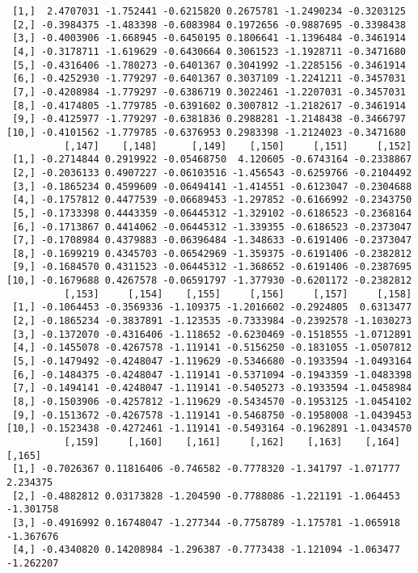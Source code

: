 \documentclass[
  letterpaper,
  DIV=11,
  numbers=noendperiod]{scrreprt}
\begin{document}
\begin{verbatim}
 [1,]  2.4707031 -1.752441 -0.6215820 0.2675781 -1.2490234 -0.3203125
 [2,] -0.3984375 -1.483398 -0.6083984 0.1972656 -0.9887695 -0.3398438
 [3,] -0.4003906 -1.668945 -0.6450195 0.1806641 -1.1396484 -0.3461914
 [4,] -0.3178711 -1.619629 -0.6430664 0.3061523 -1.1928711 -0.3471680
 [5,] -0.4316406 -1.780273 -0.6401367 0.3041992 -1.2285156 -0.3461914
 [6,] -0.4252930 -1.779297 -0.6401367 0.3037109 -1.2241211 -0.3457031
 [7,] -0.4208984 -1.779297 -0.6386719 0.3022461 -1.2207031 -0.3457031
 [8,] -0.4174805 -1.779785 -0.6391602 0.3007812 -1.2182617 -0.3461914
 [9,] -0.4125977 -1.779297 -0.6381836 0.2988281 -1.2148438 -0.3466797
[10,] -0.4101562 -1.779785 -0.6376953 0.2983398 -1.2124023 -0.3471680
          [,147]    [,148]      [,149]    [,150]     [,151]     [,152]
 [1,] -0.2714844 0.2919922 -0.05468750  4.120605 -0.6743164 -0.2338867
 [2,] -0.2036133 0.4907227 -0.06103516 -1.456543 -0.6259766 -0.2104492
 [3,] -0.1865234 0.4599609 -0.06494141 -1.414551 -0.6123047 -0.2304688
 [4,] -0.1757812 0.4477539 -0.06689453 -1.297852 -0.6166992 -0.2343750
 [5,] -0.1733398 0.4443359 -0.06445312 -1.329102 -0.6186523 -0.2368164
 [6,] -0.1713867 0.4414062 -0.06445312 -1.339355 -0.6186523 -0.2373047
 [7,] -0.1708984 0.4379883 -0.06396484 -1.348633 -0.6191406 -0.2373047
 [8,] -0.1699219 0.4345703 -0.06542969 -1.359375 -0.6191406 -0.2382812
 [9,] -0.1684570 0.4311523 -0.06445312 -1.368652 -0.6191406 -0.2387695
[10,] -0.1679688 0.4267578 -0.06591797 -1.377930 -0.6201172 -0.2382812
          [,153]     [,154]    [,155]     [,156]     [,157]     [,158]
 [1,] -0.1064453 -0.3569336 -1.109375 -1.2016602 -0.2924805  0.6313477
 [2,] -0.1865234 -0.3837891 -1.123535 -0.7333984 -0.2392578 -1.1030273
 [3,] -0.1372070 -0.4316406 -1.118652 -0.6230469 -0.1518555 -1.0712891
 [4,] -0.1455078 -0.4267578 -1.119141 -0.5156250 -0.1831055 -1.0507812
 [5,] -0.1479492 -0.4248047 -1.119629 -0.5346680 -0.1933594 -1.0493164
 [6,] -0.1484375 -0.4248047 -1.119141 -0.5371094 -0.1943359 -1.0483398
 [7,] -0.1494141 -0.4248047 -1.119141 -0.5405273 -0.1933594 -1.0458984
 [8,] -0.1503906 -0.4257812 -1.119629 -0.5434570 -0.1953125 -1.0454102
 [9,] -0.1513672 -0.4267578 -1.119141 -0.5468750 -0.1958008 -1.0439453
[10,] -0.1523438 -0.4272461 -1.119141 -0.5493164 -0.1962891 -1.0434570
          [,159]     [,160]    [,161]     [,162]    [,163]    [,164]    [,165]
 [1,] -0.7026367 0.11816406 -0.746582 -0.7778320 -1.341797 -1.071777  2.234375
 [2,] -0.4882812 0.03173828 -1.204590 -0.7788086 -1.221191 -1.064453 -1.301758
 [3,] -0.4916992 0.16748047 -1.277344 -0.7758789 -1.175781 -1.065918 -1.367676
 [4,] -0.4340820 0.14208984 -1.296387 -0.7773438 -1.121094 -1.063477 -1.262207

\end{verbatim}
\end{document}
